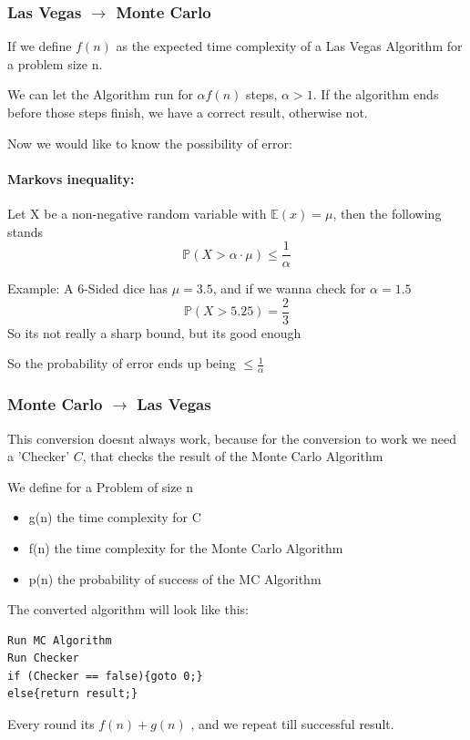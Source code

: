 \documentclass{article}
\begin{document}
\subsubsection{Las Vegas \(\to\) Monte Carlo}

If we define $f(n)$ as the expected time complexity of a Las Vegas Algorithm for a problem size n.

We can let the Algorithm run for $\alpha f(n)$ steps, $\alpha > 1$. If the algorithm ends before those steps finish, we have a correct result, otherwise not.

Now we would like to know the possibility of error:

\paragraph{Markovs inequality: } Let X be a non-negative random variable with $\mathbb{E}(x) = \mu$, then the following stands
\[\mathbb{P}(X > \alpha\cdot\mu) \leq \frac{1}{\alpha}\]

Example: A 6-Sided dice has $\mu = 3.5$, and if we wanna check for $\alpha = 1.5$
\[\mathbb{P}(X > 5.25) = \frac{2}{3}\]
So its not really a sharp bound, but its good enough

So the probability of error ends up being $\leq \frac{1}{\alpha}$

\subsubsection{Monte Carlo \(\to\) Las Vegas}
This conversion doesnt always work, because for the conversion to work we need a 'Checker' $C$, that checks the result of the Monte Carlo Algorithm

We define for a Problem of size n
\begin{itemize}
    \item g(n) the time complexity for C
    \item f(n) the time complexity for the Monte Carlo Algorithm
    \item p(n) the probability of success of the MC Algorithm 
\end{itemize}

The converted algorithm will look like this: 
\begin{verbatim}
Run MC Algorithm
Run Checker
if (Checker == false){goto 0;}
else{return result;}
\end{verbatim}

Every round its $f(n)+ g(n)$ , and we repeat till successful result.
\end{document}
